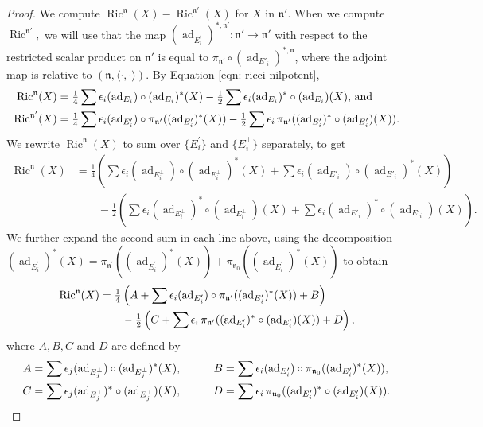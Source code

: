 \documentclass[10pt,a4paper]{amsart}
\newcommand\ad{\operatorname{ad}}
\newcommand\ip{{\langle\cdot {,} \cdot\rangle}}
\newcommand\n{{\mathfrak{n}}}
\newcommand{\Ric}{\operatorname{Ric}}
\newcommand{\frakn}{\ensuremath{\mathfrak{n}} }
\begin{document}
\begin{proof} We  compute  $\Ric^\n (X) - \Ric^{\n'} (X)$ for $X$ in $\n'.$
When we compute  $\Ric^{\n'},$ we will use that the  map $(\ad_{E_i^\prime})^{\ast, \frakn'}:\frakn' \to \frakn'$ 
 with respect to the restricted scalar product on $\frakn'$ is
equal to $\pi_{\n'} \circ (\ad_{E'_i})^{\ast,\frakn}$, where the adjoint map is relative to $(\frakn,\ip).$
By Equation \eqref{eqn: ricci-nilpotent},
\begin{align} \Ric^{\n} (X) &= \tfrac 14 \sum \epsilon_i  (\ad_{E_i}) \circ (\ad_{E_i})^* (X) - \tfrac 12 \sum \epsilon_i (\ad_{E_i})^* \circ  (\ad_{E_i})  (X), \, \text{and}
\notag \\
 \Ric^{\n'} (X) &= \tfrac 14 \sum \epsilon_i  (\ad_{E'_i}) \circ
 \pi_{\frakn^\prime} ((\ad_{E'_i})^* (X)) 
 - \tfrac 12 \sum \epsilon_i \, \pi_{\n'}((\ad_{E'_i})^* \circ  (\ad_{E'_i})  (X)). \notag 
\end{align}
We rewrite $ \Ric^{\n} (X)$ to sum over $\{ E_i^\prime\}$ and $\{E_i^\perp\}$ separately, to get
\begin{align*}  \Ric^{\n} (X) &= \tfrac 14 \left(\sum \epsilon_i  (\ad_{E_i^\perp}) \circ (\ad_{E_i^\perp})^* (X) + 
\sum \epsilon_i  (\ad_{E'_i})  \circ (\ad_{E'_i})^* (X) \right)    \\
& \qquad - \tfrac 12\left(\sum\epsilon_i  (\ad_{E_i^\perp})^* \circ  (\ad_{E_i^\perp})  (X) + 
\sum \epsilon_i  (\ad_{E'_i})^* \circ  (\ad_{E'_i})  (X)  \right). 
\end{align*}
We further expand  the second sum in each line above, using the decomposition
$(\ad_{E_i^\prime})^\ast(X) = \pi_{\frakn^\prime}
( (\ad_{E_i^\prime})^\ast (X) ) + 
\pi_{\frakn_0} ( (\ad_{E_i^\prime})^\ast(X) )$
to obtain
\begin{align}  \Ric^{\n} (X) 
&= \tfrac 14\left(A + \sum \epsilon_i  (\ad_{E'_i})  \circ \pi_{\n'}((\ad_{E'_i})^*
  (X)) +    B \right) 
\notag \\
& \qquad - \tfrac 12 \left(C + \sum  \epsilon_i \, \pi_{\n'}((\ad_{E'_i})^* \circ
  (\ad_{E'_i}) (X))  + D \right),\notag \end{align}
where $A, B, C$ and $D$ are defined by 
  \begin{alignat}{2} 
A &= \sum \epsilon_j (\ad_{E_j^\perp}) \circ  (\ad_{E_j^\perp})^* (X),& \qquad  
B &=  \sum \epsilon_i  (\ad_{E'_i}) \circ \pi_{\n_0}((\ad_{E'_i})^* (X)), \notag \\
C &=  \sum\epsilon_j  (\ad_{E_j^\perp})^* \circ  (\ad_{E_j^\perp})  (X),& \qquad
D &= \sum \epsilon_i \, \pi_{\n_0}((\ad_{E'_i})^* \circ (\ad_{E'_i}) (X)). \notag

\end{alignat}
\end{proof}
\end{document}
